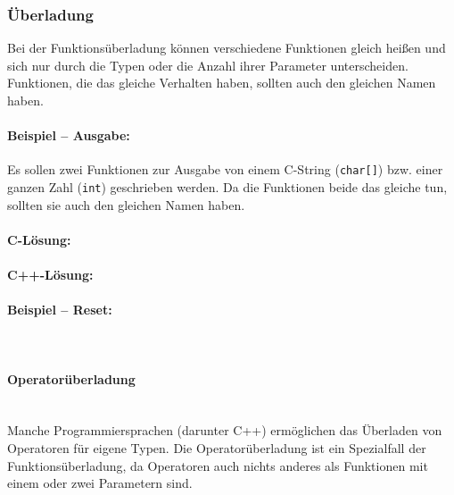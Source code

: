 		\subsubsection{Überladung}
			Bei der Funktionsüberladung können verschiedene Funktionen gleich heißen und sich nur durch die Typen oder die
			Anzahl ihrer Parameter unterscheiden. Funktionen, die das gleiche Verhalten haben, sollten auch den gleichen
			Namen haben.
			
			\paragraph*{Beispiel -- Ausgabe:}
				Es sollen zwei Funktionen zur Ausgabe von einem C-String (\lstinline|char[]|) bzw. einer ganzen Zahl
				(\lstinline|int|) geschrieben werden. Da die Funktionen beide das gleiche tun, sollten sie auch den gleichen
				Namen haben.
				
				\paragraph*{C-Lösung:}
					\UseRawInputEncoding{}
					\UseRawInputEncoding{}
				
				\paragraph*{C++-Lösung:}
					\UseRawInputEncoding{}
					\UseRawInputEncoding{}
			
			\paragraph*{Beispiel -- Reset:}\mbox{}\\
				\UseRawInputEncoding{}
		
			\paragraph{Operatorüberladung}\mbox{}\\
				Manche Programmiersprachen (darunter C++) ermöglichen das Überladen von Operatoren für eigene Typen. Die
				Operatorüberladung ist ein Spezialfall der Funktionsüberladung, da Operatoren auch nichts anderes als
				Funktionen mit einem oder zwei Parametern sind.
				

